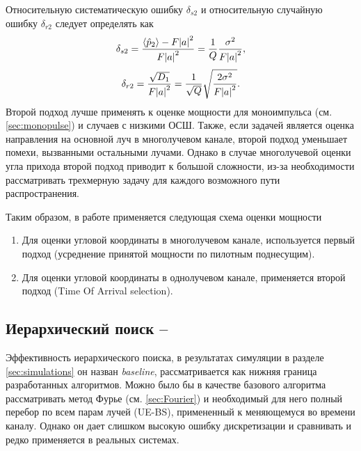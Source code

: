 Относительную систематическую ошибку $\delta_{s2}$ и относительную случайную ошибку $\delta_{r2}$ следует
определять как
\begin{equation}
    \delta_{s2} = \frac{\langle \hat p_2 \rangle - F \abs{a}^2}{F \abs{a}^2} = \frac{1}{Q} \frac{\sigma^2}{F\abs{a}^2},
\end{equation}
\begin{equation}
    \delta_{r2} = \frac{\sqrt{D_1}}{F\abs{a}^2} = \frac{1}{\sqrt Q} \sqrt{\frac{2\sigma^2}{F\abs{a}^2}}.
\end{equation}
Второй подход лучше применять к оценке мощности для моноимпульса (см. \ref{sec:monopulse}) и случаев с
низкими ОСШ. Также, если задачей является оценка направления на основной луч в
многолучевом канале, второй подход уменьшает помехи, вызванными остальными лучами.
Однако в случае многолучевой оценки угла прихода второй подход приводит к
большой сложности, из-за необходимости рассматривать трехмерную задачу для
каждого возможного пути распространения.

Таким образом, в работе применяется следующая схема оценки мощности
\begin{enumerate}
    \item Для оценки угловой координаты в многолучевом канале, используется
    первый подход (усреднение принятой мощности по пилотным поднесущим). 
    \item Для оценки угловой координаты в однолучевом канале, применяется второй
    подход (Time Of Arrival selection). 
\end{enumerate}



\subsection[Иерархический поиск]{Иерархический поиск -- \baseline{}}
\label{sec:hSearch}\label{sec:hierarchy:search}
Эффективность иерархического поиска, в результатах симуляции в разделе
\ref{sec:simulations} он назван \textit{baseline}, рассматривается как нижняя
граница разработанных алгоритмов.  Можно было бы в качестве базового алгоритма
рассматривать метод Фурье (см. \ref{sec:Fourier}) и необходимый для него полный
перебор по всем парам лучей (UE-BS), примененный к меняющемуся во времени
каналу.  Однако он дает слишком высокую ошибку дискретизации и сравнивать и
редко применяется в реальных системах.

